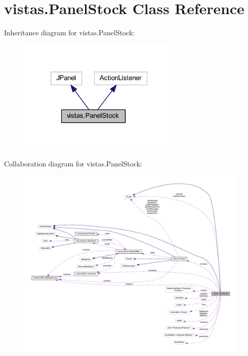 \hypertarget{classvistas_1_1_panel_stock}{}\section{vistas.\+Panel\+Stock Class Reference}
\label{classvistas_1_1_panel_stock}


Inheritance diagram for vistas.\+Panel\+Stock\+:
\nopagebreak
\begin{figure}[H]
\begin{center}
\leavevmode
\includegraphics[width=224pt]{classvistas_1_1_panel_stock__inherit__graph}
\end{center}
\end{figure}


Collaboration diagram for vistas.\+Panel\+Stock\+:
\nopagebreak
\begin{figure}[H]
\begin{center}
\leavevmode
\includegraphics[width=350pt]{classvistas_1_1_panel_stock__coll__graph}
\end{center}
\end{figure}

